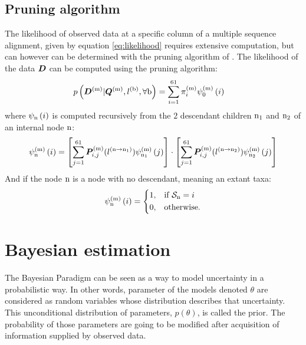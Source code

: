 \subsection{Pruning algorithm}
The \gls{likelihood} of observed data at a specific column of a multiple sequence alignment, given by equation \ref{eq:likelihood} requires extensive computation, but can however can be determined with the pruning algorithm of \citet{Felsenstein1985}. 
The \gls{likelihood} of the data $\bm{D}$ can be computed using the pruning algorithm:
\begin{align}
p\left(\bm{D}^{(\text{m})}| \bm{Q}^{(\text{m})}, l^{(\text{b})}, \forall \text{b} \right) & = \sum\limits_{{i}=1}^{61} \pi^{(\text{m})}_{{i}} \psi^{(\text{m})}_{0} \left( {i} \right)
\end{align}
where $\psi_{\text{n}} \left( {i} \right)$ is computed recursively from the $2$ descendant children $\text{n}_{1}$ and $\text{n}_{2}$ of an internal node $\text{n}$:
\begin{align}
\psi^{(\text{m})}_{\text{n}} \left( {i} \right) = 
\left[ \sum\limits_{{j}=1}^{61}\bm{P}^{(\text{m})}_{{i}, {j}}(l^{(\text{n} \to \text{n}_{1})}) \psi^{(\text{m})}_{\text{n}_{1}} \left( {j} \right) \right]
\cdot 
\left[ \sum\limits_{{j}=1}^{61}\bm{P}^{(\text{m})}_{{i}, {j}}(l^{(\text{n} \to \text{n}_{2})}) \psi^{(\text{m})}_{\text{n}_{2}} \left( {j} \right) \right]
\end{align}
And if the node $\text{n}$ is a node with no descendant, meaning an extant taxa:
\begin{align}
\psi^{(\text{m})}_{\text{n}} \left( {i} \right) =
\begin{dcases}
1, & \text{if } \mathcal{S}_{\text{n}} = {i} \\
0, & \text{otherwise.}
\end{dcases}
\end{align}

\section{Bayesian estimation}
\label{sec-intro:bayesian}

The Bayesian Paradigm can be seen as a way to model uncertainty in a probabilistic way.
In other words, parameter of the models denoted $\theta$ are considered as random variables whose distribution describes that uncertainty.
This unconditional distribution of parameters, $p(\theta)$, is called the \gls{prior}.
The probability of those parameters are going to be modified after acquisition of information supplied by observed data.


